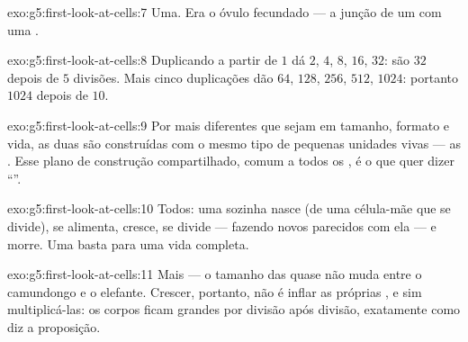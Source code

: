 \begin{solution}{exo:g5:first-look-at-cells:7}
Uma. Era o óvulo fecundado --- a junção de um  com uma
.
\end{solution}

\begin{solution}{exo:g5:first-look-at-cells:8}
Duplicando a partir de $1$ dá $2$, $4$, $8$, $16$, $32$: são $32$
 depois de $5$ divisões. Mais cinco duplicações dão $64$,
$128$, $256$, $512$, $1024$: portanto $1024$  depois de
$10$.
\end{solution}

\begin{solution}{exo:g5:first-look-at-cells:9}
Por mais diferentes que sejam em tamanho, formato e vida, as duas são
construídas com o mesmo tipo de pequenas unidades vivas --- as
. Esse plano de construção compartilhado, comum a todos os
, é o que quer dizer ``''.
\end{solution}

\begin{solution}{exo:g5:first-look-at-cells:10}
Todos: uma  sozinha nasce (de uma célula-mãe que se divide), se
alimenta, cresce, se divide --- fazendo novos  parecidos
com ela --- e morre. Uma  basta para uma vida completa.
\end{solution}

\begin{solution}{exo:g5:first-look-at-cells:11}
Mais  --- o tamanho das  quase não muda entre o
camundongo e o elefante. Crescer, portanto, não é inflar as próprias
, e sim multiplicá-las: os corpos ficam grandes por divisão
após divisão, exatamente como diz a proposição.
\end{solution}
